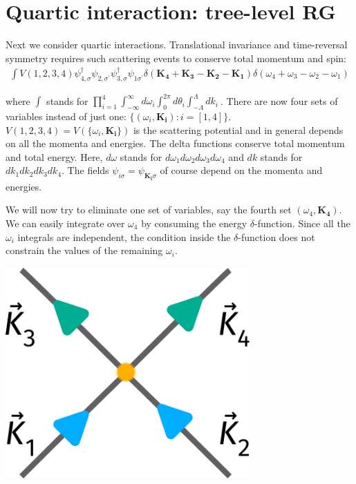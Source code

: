 \documentclass{article}
\begin{document}
\section{Quartic interaction: tree-level RG}
Next we consider quartic interactions. Translational invariance and time-reversal symmetry requires such scattering events to conserve total momentum and spin:
\begin{equation}\begin{aligned}
	\int V(1,2,3,4)\psi_{4,\sigma}^\dagger\psi_{2,\sigma^\prime}\psi_{3,\sigma}^\dagger\psi_{1\sigma^\prime} \delta(\mathbf{K_4}+\mathbf{K_3} - \mathbf{K_2} - \mathbf{K_1})\delta({\omega_4}+{\omega_3} - {\omega_2} - {\omega_1})
\end{aligned}\end{equation}
\begin{minipage}{0.6\textwidth}
where \(\int\) stands for  \(\prod_{i=1}^4\int_{-\infty}^\infty d\omega_i \int_{0}^{2\pi}d\theta_i \int_{-\Lambda}^\Lambda dk_i~\). There are now four sets of variables instead of just one: \(\{(\omega_i, \mathbf{K_i}) : i=[1,4]\}\). \(V(1,2,3,4) = V(\{\omega_i, \mathbf{K_i}\})\) is the scattering potential and in general depends on all the momenta and energies. The delta functions conserve total momentum and total energy. Here, \(d\omega\) stands for \(d\omega_1d\omega_2d\omega_3d\omega_4\) and \(dk\) stands for \(dk_1dk_2dk_3dk_4\). The fields \(\psi_{i\sigma} = \psi_{\mathbf{K_i}\sigma}\) of course depend on the momenta and energies. 

We will now try to eliminate one set of variables, say the fourth set \((\omega_4, \mathbf{K_4})\). We can easily integrate over \(\omega_4\) by consuming the energy \(\delta\)-function. Since all the \(\omega_i\) integrals are independent, the condition inside the \(\delta\)-function does not constrain the values of the remaining \(\omega_i\).
\end{minipage}
\hspace*{\fill}
\begin{minipage}{0.3\textwidth}
\begin{center}\includegraphics[width=0.7\textwidth]{./figures/term.pdf}\end{center}
\end{minipage}
\end{document}
